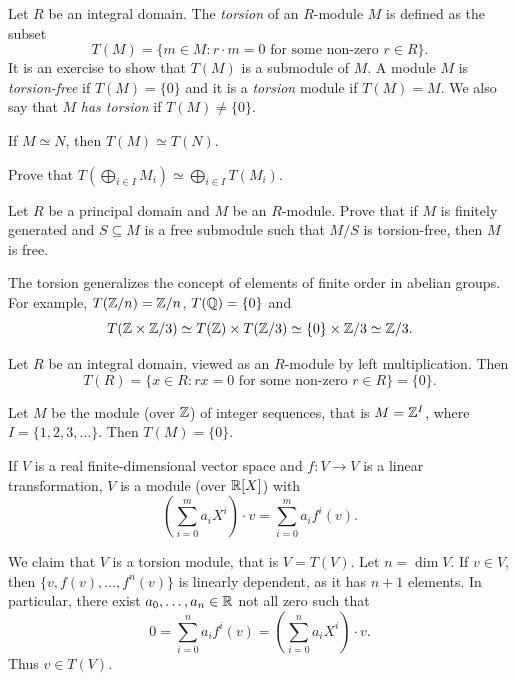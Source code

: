 Let $R$ be an integral domain. The \emph{torsion} of an $R$-module $M$ 
is defined as the subset 
\[
T(M)=\{m\in M:r\cdot m=0\text{ for some non-zero $r\in R$}\}.
\]
It is an exercise to show that $T(M)$ is a submodule of $M$. 
A module $M$ is 
\emph{torsion-free} if $T(M)=\{0\}$ and it is 
a \emph{torsion} module if $T(M)=M$.  We also say that $M$ \emph{has torsion}
if $T(M)\ne\{0\}$. 

\begin{exercise}
If $M\simeq N$, then $T(M)\simeq T(N)$.
\end{exercise}

\begin{exercise}
Prove that $T(\bigoplus_{i\in I}M_i)\simeq \bigoplus_{i\in I}T(M_i)$.
\end{exercise}

\begin{exercise}
\label{xca:free}
    Let $R$ be a principal domain and $M$ be an $R$-module. Prove that
    if $M$ is finitely generated and $S\subseteq M$ is a free submodule such that
    $M/S$ is torsion-free, then $M$ is free.
\end{exercise}

The torsion generalizes the concept of elements of finite order in abelian groups. For example, 
 $T(\mathbb{Z}/n)=\mathbb{Z}/n$, $T(\mathbb{Q})=\{0\}$ and
 \[
 T(\mathbb{Z}\times\mathbb{Z}/3)\simeq T(\mathbb{Z})\times T(\mathbb{Z}/3)\simeq \{0\}\times\mathbb{Z}/3\simeq\mathbb{Z}/3.
 \]


\begin{example}
    Let $R$ be an integral domain, viewed as an $R$-module by
    left multiplication. Then
    \[
    T(R)=\{x\in R:rx=0\text{ for some non-zero $r\in R$}\}
    =\{0\}.
    \]
\end{example}

\begin{example}
    Let $M$ be the module (over $\mathbb{Z}$) of
    integer sequences, that is $M=\mathbb{Z}^I$, where 
    $I=\{1,2,3,\dots\}$. Then $T(M)=\{0\}$. 
\end{example}

\begin{example}
If $V$ is a real finite-dimensional vector space and $f\colon V\to V$ 
is a linear transformation, $V$ is a module (over $\mathbb{R}[X]$) 
with 
\[
\left(\sum_{i=0}^m a_iX^i\right)\cdot v=\sum_{i=0}^m a_if^i(v).
\]

We claim that 
$V$ is a torsion module, that is $V=T(V)$. Let $n=\dim V$. If $v\in V$, 
then $\{v,f(v),\dots,f^n(v)\}$ is linearly dependent, as it has 
$n+1$ elements. In particular, there exist $a_0,\dots,a_n\in\mathbb{R}$ not all zero such that
\[
0=\sum_{i=0}^n a_if^i(v)=\left(\sum_{i=0}^n a_iX^i\right)\cdot v.
\]
Thus $v\in T(V)$. 
\end{example}

